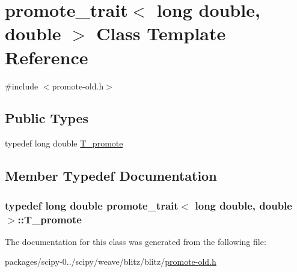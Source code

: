 \hypertarget{classpromote__trait_3_01long_01double_00_01double_01_4}{}\section{promote\+\_\+trait$<$ long double, double $>$ Class Template Reference}
\label{classpromote__trait_3_01long_01double_00_01double_01_4}


{\ttfamily \#include $<$promote-\/old.\+h$>$}

\subsection*{Public Types}
\begin{DoxyCompactItemize}
\item 
typedef long double \hyperlink{classpromote__trait_3_01long_01double_00_01double_01_4_a2ffac973bab8c6aa5f25392367d26b38}{T\+\_\+promote}
\end{DoxyCompactItemize}


\subsection{Member Typedef Documentation}
\hypertarget{classpromote__trait_3_01long_01double_00_01double_01_4_a2ffac973bab8c6aa5f25392367d26b38}{}
\subsubsection[{T\+\_\+promote}]{\setlength{\rightskip}{0pt plus 5cm}typedef long double {\bf promote\+\_\+trait}$<$ long double, double $>$\+::{\bf T\+\_\+promote}}\label{classpromote__trait_3_01long_01double_00_01double_01_4_a2ffac973bab8c6aa5f25392367d26b38}


The documentation for this class was generated from the following file\+:\begin{DoxyCompactItemize}
\item 
packages/scipy-\/0../scipy/weave/blitz/blitz/\hyperlink{promote-old_8h}{promote-\/old.\+h}\end{DoxyCompactItemize}
